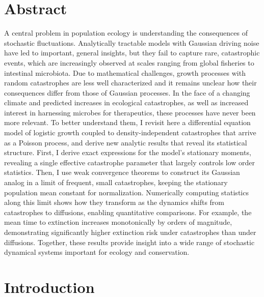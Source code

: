 \section{Abstract}
A central problem in population ecology is understanding the consequences of stochastic fluctuations.  Analytically tractable models with Gaussian driving noise have led to important, general insights, but they fail to capture rare, catastrophic events, which are increasingly observed at scales ranging from global fisheries to intestinal microbiota.  Due to mathematical challenges, growth processes with random catastrophes are less well characterized and it remains unclear how their consequences differ from those of Gaussian processes.  In the face of a changing climate and predicted increases in ecological catastrophes, as well as increased interest in harnessing microbes for therapeutics, these processes have never been more relevant.  To better understand them, I revisit here a differential equation model of logistic growth coupled to density-independent catastrophes that arrive as a Poisson process, and derive new analytic results that reveal its statistical structure.  First, I derive exact expressions for the model's stationary moments, revealing a single effective catastrophe parameter that largely controls low order statistics.  Then, I use weak convergence theorems to construct its Gaussian analog in a limit of frequent, small catastrophes, keeping the stationary population mean constant for normalization.  Numerically computing statistics along this limit shows how they transform as the dynamics shifts from catastrophes to diffusions, enabling quantitative comparisons.  For example, the mean time to extinction increases monotonically by orders of magnitude, demonstrating significantly higher extinction risk under catastrophes than under diffusions. Together, these results provide insight into a wide range of stochastic dynamical systems important for ecology and conservation.

\newpage

\section{Introduction}


